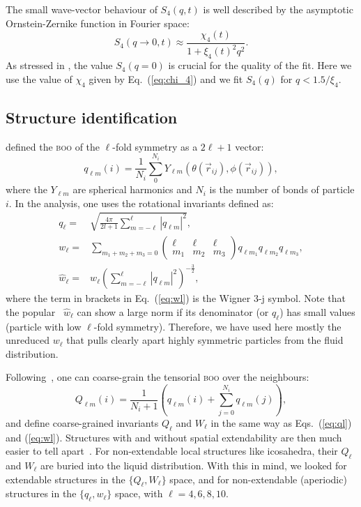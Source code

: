 The small wave-vector behaviour of $S_4(q,t)$ is well described by the asymptotic Ornstein-Zernike function in Fourier space:
\begin{equation}
	S_4(q\rightarrow 0,t) \approx \frac{\chi_4(t)}{1+\xi_4(t)^2 q^2}.
	\label{eq:OZ_Fourier}
\end{equation}
As stressed in \citep{Flenner2011}, the value $S_4(q=0)$ is crucial for the quality of the fit. Here we use the value of $\chi_4$ given by Eq.~(\ref{eq:chi_4}) and we fit $S_4(q)$ for $q<1.5/\xi_4$.

\subsection*{Structure identification}

\citet{steinhardt1983boo} defined the \textsc{boo} of the $\ell$-fold symmetry as a $2\ell+1$ vector:
\begin{equation}
	q_{\ell m}(i) = \frac{1}{N_i}\sum_{0}^{N_i} Y_{\ell m}(\theta(\vec r_{ij}),\phi(\vec r_{ij})),
	\label{eq:qlm}
\end{equation}
where the $Y_{\ell m}$ are spherical harmonics and $N_i$ is the number of bonds of particle $i$. In the analysis, one uses the rotational invariants defined as:
\begin{align}
	q_\ell =& \sqrt{\frac{4\pi}{2l+1} \sum_{m=-\ell}^{\ell} |q_{\ell m}|^2 }, \label{eq:ql}\\
	w_\ell =& \sum_{m_1+m_2+m_3=0} 
			\left( \begin{array}{ccc}
				\ell & \ell & \ell \\
				m_1 & m_2 & m_3 
			\end{array} \right)
			q_{\ell m_1} q_{\ell m_2} q_{\ell m_3}, \label{eq:wl}\\
	\hat{w}_\ell =& w_\ell{\left( \sum_{m=-\ell}^{\ell} |q_{\ell m}|^2 \right)}^{-\frac{3}{2}},
\end{align}
where the term in brackets in Eq.~(\ref{eq:wl}) is the Wigner 3-j symbol. Note that the popular~\citep{steinhardt1983boo,Lechner2008} $\hat{w}_\ell$ can show a large norm if its denominator (or $q_\ell$) has small values (particle with low $\ell$-fold symmetry). Therefore, we have used here mostly the unreduced $w_\ell$ that pulls clearly apart highly symmetric particles from the fluid distribution.

Following~\citet{Lechner2008}, one can coarse-grain the tensorial \textsc{boo} over the neighbours:
\begin{equation}
	Q_{\ell m}(i) = \frac{1}{N_i+1}\left( q_{\ell m}(i) +  \sum_{j=0}^{N_i} q_{\ell m}(j)\right), 
	\label{eq:Qlm}
\end{equation}
and define coarse-grained invariants $Q_\ell$ and $W_\ell$ in the same way as Eqs.~(\ref{eq:ql}) and (\ref{eq:wl}). Structures with and without spatial extendability are then much easier to tell apart~\citep{Lechner2008}. For non-extendable local structures like icosahedra, their $Q_\ell$ and $W_\ell$ are buried into the liquid distribution. With this in mind, we looked for extendable structures in the $\lbrace Q_\ell, W_\ell\rbrace$ space, and for non-extendable (aperiodic) structures in the $\lbrace q_\ell, w_\ell\rbrace$ space, with $\ell=4,6,8,10$.

